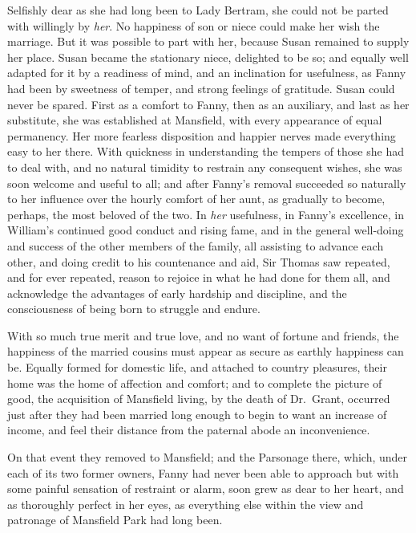 Selfishly dear as she had long been to Lady Bertram,
she could not be parted with willingly by \emph{her}.
No happiness of son or niece could make her wish
the marriage.  But it was possible to part with her,
because Susan remained to supply her place.
Susan became the stationary niece, delighted to be so;
and equally well adapted for it by a readiness of mind,
and an inclination for usefulness, as Fanny had been
by sweetness of temper, and strong feelings of gratitude.
Susan could never be spared.  First as a comfort to Fanny,
then as an auxiliary, and last as her substitute,
she was established at Mansfield, with every appearance
of equal permanency.  Her more fearless disposition
and happier nerves made everything easy to her there.
With quickness in understanding the tempers of those she
had to deal with, and no natural timidity to restrain
any consequent wishes, she was soon welcome and useful
to all; and after Fanny's removal succeeded so naturally
to her influence over the hourly comfort of her aunt,
as gradually to become, perhaps, the most beloved of the two.
In \emph{her} usefulness, in Fanny's excellence, in William's
continued good conduct and rising fame, and in the general
well-doing and success of the other members of the family,
all assisting to advance each other, and doing credit
to his countenance and aid, Sir Thomas saw repeated,
and for ever repeated, reason to rejoice in what he had
done for them all, and acknowledge the advantages of early
hardship and discipline, and the consciousness of being born
to struggle and endure.

With so much true merit and true love, and no want of
fortune and friends, the happiness of the married cousins
must appear as secure as earthly happiness can be.
Equally formed for domestic life, and attached to
country pleasures, their home was the home of affection
and comfort; and to complete the picture of good,
the acquisition of Mansfield living, by the death of
Dr.\ Grant, occurred just after they had been married long
enough to begin to want an increase of income, and feel
their distance from the paternal abode an inconvenience.

On that event they removed to Mansfield; and the Parsonage
there, which, under each of its two former owners, Fanny had
never been able to approach but with some painful sensation
of restraint or alarm, soon grew as dear to her heart,
and as thoroughly perfect in her eyes, as everything else
within the view and patronage of Mansfield Park had long been.



%
%
